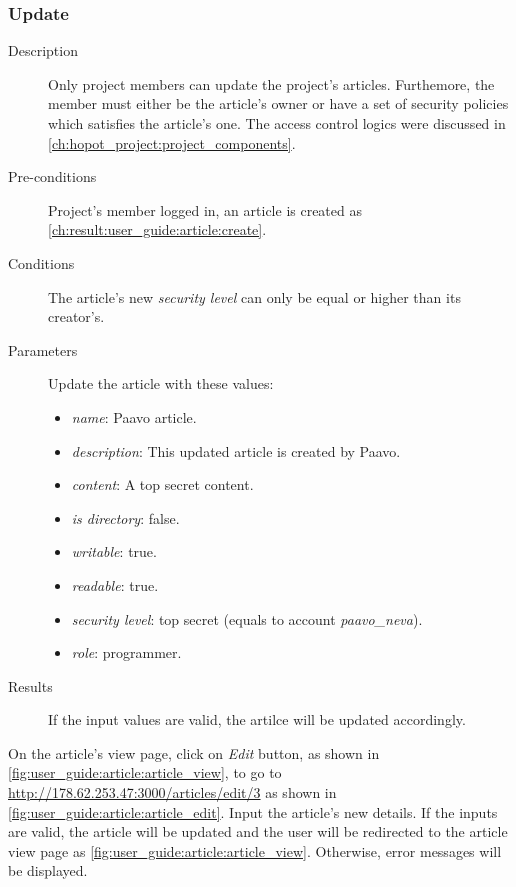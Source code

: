 \clearpage

\subsubsection{Update}
\label{ch:result:user_guide:article:update}

\begin{description}
\item[Description] Only project members can update the project's articles.
Furthemore, the member must either be the article's owner or have a set of security policies which satisfies the article's one.
The access control logics were discussed in \autoref{ch:hopot_project:project_components}.
\item[Pre-conditions] Project's member logged in, an article is created as \autoref{ch:result:user_guide:article:create}.
\item[Conditions] The article's new \emph{security level} can only be equal or higher than its creator's.
\item[Parameters] Update the article with these values:
\begin{itemize}
\item \emph{name}: Paavo article.
\item \emph{description}: This updated article is created by Paavo.
\item \emph{content}: A top secret content.
\item \emph{is directory}: false.
\item \emph{writable}: true.
\item \emph{readable}: true.
\item \emph{security level}: top secret (equals to account \emph{paavo\_neva}).
\item \emph{role}: programmer.
\end{itemize}
\item[Results] If the input values are valid, the artilce will be updated accordingly.
\end{description}

On the article's view page, click on \emph{Edit} button, as shown in \autoref{fig:user_guide:article:article_view}, to go to \href{http://178.62.253.47:3000/articles/edit/3}{http://178.62.253.47:3000/articles/edit/3} as shown in \autoref{fig:user_guide:article:article_edit}.
Input the article's new details.
If the inputs are valid, the article will be updated and the user will be redirected to the article view page as \autoref{fig:user_guide:article:article_view}.
Otherwise, error messages will be displayed.

